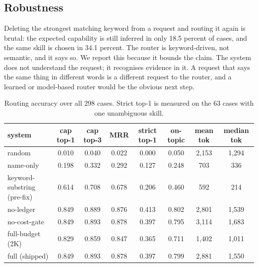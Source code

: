 \documentclass[sigconf,acmsmall]{acmart}
\begin{document}
\subsection{Robustness}
Deleting the strongest matching keyword from a request and routing it again is brutal: the expected capability is still inferred in only 18.5 percent of cases, and the same skill is chosen in 34.1 percent. The router is keyword-driven, not semantic, and it says so.
We report this because it bounds the claim. The system does not understand the request; it recognises evidence in it. A request that says the same thing in different words is a different request to the router, and a learned or model-based router would be the obvious next step.

\begin{table}[t]
\centering
\caption{Routing accuracy over all 298 cases. Strict top-1 is measured on the 63 cases with one unambiguous skill.}
\label{tab:routing}
\begin{tabular}{lccccccc}
\toprule
\textbf{system} & \textbf{cap top-1} & \textbf{cap top-3} & \textbf{MRR} & \textbf{strict top-1} & \textbf{on-topic} & \textbf{mean tok} & \textbf{median tok} \\
\midrule
random & 0.010 & 0.040 & 0.022 & 0.000 & 0.050 & 2,153 & 1,294 \\
name-only & 0.198 & 0.332 & 0.292 & 0.127 & 0.248 & 703 & 336 \\
keyword-substring (pre-fix) & 0.614 & 0.708 & 0.678 & 0.206 & 0.460 & 592 & 214 \\
no-ledger & 0.849 & 0.889 & 0.876 & 0.413 & 0.802 & 2,801 & 1,539 \\
no-cost-gate & 0.849 & 0.893 & 0.878 & 0.397 & 0.795 & 3,114 & 1,683 \\
full-budget (2K) & 0.829 & 0.859 & 0.847 & 0.365 & 0.711 & 1,402 & 1,011 \\
full (shipped) & 0.849 & 0.893 & 0.878 & 0.397 & 0.799 & 2,881 & 1,550 \\
\bottomrule
\end{tabular}
\end{table}
\end{document}
